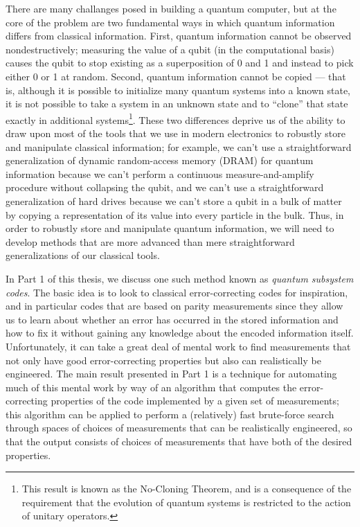 \documentclass{amsbook}
\theoremstyle{plain}
\theoremstyle{definition}
\theoremstyle{remark}
\begin{document}
There are many challanges posed in building a quantum computer, but at the core of the problem are two fundamental ways in which quantum information differs from classical information.  First, quantum information cannot be observed nondestructively;  measuring the value of a qubit (in the computational basis) causes the qubit to stop existing as a superposition of 0 and 1 and instead to pick either 0 or 1 at random.  Second, quantum information cannot be copied --- that is, although it is possible to initialize many quantum systems into a known state, it is not possible to take a system in an unknown state and to ``clone'' that state exactly in additional systems\footnote{This result is known as the No-Cloning Theorem, and is a consequence of the requirement that the evolution of quantum systems is restricted to the action of unitary operators\cite{Wootters1982}.}.  These two differences deprive us of the ability to draw upon most of the tools that we use in modern electronics to robustly store and manipulate classical information;  for example, we can't use a straightforward generalization of dynamic random-access memory (DRAM) for quantum information because we can't perform a continuous measure-and-amplify procedure without collapsing the qubit, and we can't use a straightforward generalization of hard drives because we can't store a qubit in a bulk of matter by copying a representation of its value into every particle in the bulk.  Thus, in order to robustly store and manipulate quantum information, we will need to develop methods that are more advanced than mere straightforward generalizations of our classical tools.

In Part 1 of this thesis, we discuss one such method known as \emph{quantum subsystem codes}.  The basic idea is to look to classical error-correcting codes for inspiration, and in particular codes that are based on parity measurements since they allow us to learn about whether an error has occurred in the stored information and how to fix it without gaining any knowledge about the encoded information itself.  Unfortunately, it can take a great deal of mental work to find measurements that not only have good error-correcting properties but also can realistically be engineered.  The main result presented in Part 1 is a technique for automating much of this mental work by way of an algorithm that computes the error-correcting properties of the code implemented by a given set of measurements;  this algorithm can be applied to perform a (relatively) fast brute-force search through spaces of choices of measurements that can be realistically engineered, so that the output consists of choices of measurements that have both of the desired properties.
\end{document}
